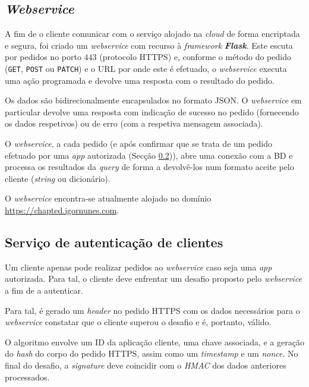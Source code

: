 \subsection{\textit{Webservice}}
\label{ssec::implementacao:detalhes:webservice}

A fim de o cliente comunicar com o serviço alojado na \textit{cloud} de forma encriptada e segura, foi criado um \textit{webservice} com recurso à \textit{framework} \textit{\bfseries Flask}. Este escuta por pedidos no porto $443$ (protocolo \ac{HTTPS}) e, conforme o método do pedido (\verb|GET|, \verb|POST| ou \verb|PATCH|) e o \ac{URL} por onde este é efetuado, o \textit{webservice} executa uma ação programada e devolve uma resposta com o resultado do pedido.

Os dados são bidirecionalmente encapsulados no formato \ac{JSON}. O \textit{webservice} em particular devolve uma resposta com indicação de sucesso no pedido (fornecendo os dados respetivos) ou de erro (com a respetiva mensagem associada).

O \textit{webservice}, a cada pedido (e após confirmar que se trata de um pedido efetuado por uma \textit{app} autorizada (Secção \ref{ssec::implementacao:detalhes:auth})), abre uma conexão com a \acl{BD} e processa os resultados da \textit{query} de forma a devolvê-los num formato aceite pelo cliente (\textit{string} ou dicionário).

O \textit{webservice} encontra-se atualmente alojado no domínio \url{https://chapted.igornunes.com}.


\subsection{Serviço de autenticação de clientes}
\label{ssec::implementacao:detalhes:auth}

Um cliente apenas pode realizar pedidos ao \textit{webservice} caso seja uma \textit{app} autorizada. Para tal, o cliente deve enfrentar um desafio proposto pelo \textit{webservice} a fim de a autenticar.

Para tal, é gerado um \textit{header} no pedido \ac{HTTPS} com os dados necessários para o \textit{webservice} constatar que o cliente superou o desafio e é, portanto, válido.

O algoritmo envolve um ID da aplicação cliente, uma chave associada, e a geração do \textit{hash} do corpo do pedido \ac{HTTPS}, assim como um \textit{timestamp} e um \textit{nonce}. No final do desafio, a \textit{signature} deve coincidir com o \textit{HMAC} dos dados anteriores processados.

